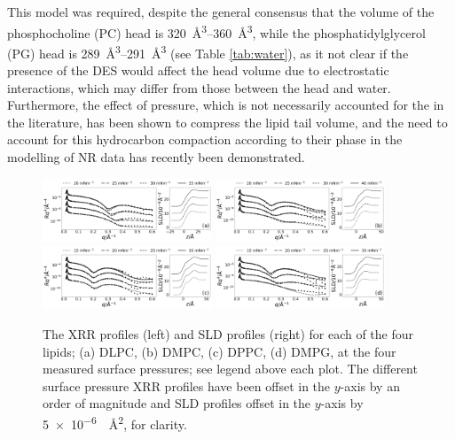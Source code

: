 \documentclass[twocolumn,a4paper]{paper}
\begin{document}
This model was required, despite the general consensus that the volume of the phosphocholine (PC) head is \SIrange{320}{360}{\cubic\angstrom}, while the phosphatidylglycerol (PG) head is \SIrange{289}{291}{\cubic\angstrom} (see Table \ref{tab:water}), as it not clear if the presence of the DES would affect the head volume due to electrostatic interactions, which may differ from those between the head and water.
Furthermore, the effect of pressure, which is not necessarily accounted for the in the literature, has been shown to compress the lipid tail volume\cite{Marsh2010,Small1984}, and the need to account for this hydrocarbon compaction according to their phase in the modelling of NR data has recently been demonstrated\cite{Campbell2018}.
%
\begin{figure}
	\centering
	\includegraphics[width=0.45\textwidth]{figures/dlpc_ref_sld}
	\includegraphics[width=0.45\textwidth]{figures/dmpc_ref_sld}
	\includegraphics[width=0.45\textwidth]{figures/dppc_ref_sld}
	\includegraphics[width=0.45\textwidth]{figures/dmpg_ref_sld}
	\caption{\small The XRR profiles (left) and SLD profiles (right) for each of the four lipids; (a) DLPC, (b) DMPC, (c) DPPC, (d) DMPG, at the four measured surface pressures; see legend above each plot. The different surface pressure XRR profiles have been offset in the $y$-axis by an order of magnitude and SLD profiles offset in the $y$-axis by \SI{5e-6}{\per\square\angstrom}, for clarity.}
	\label{fig:lipids}
\end{figure}
%
\end{document}
